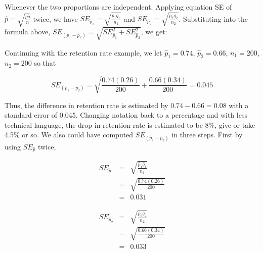 \documentclass[11pt]{book}\usepackage[]{graphicx}\usepackage[]{color}
\begin{document}
Whenever the two proportions are independent.  Applying equation SE of $\hat{p} = \sqrt{ \frac{ \hat{p} \hat{q} }{n}}$ twice, we have $SE_{\hat{p}_1} = \sqrt{ \frac{ \hat{p}_1 \hat{q}_1 }{n_1}}$ and $SE_{\hat{p}_2} = \sqrt{ \frac{ \hat{p}_2 \hat{q}_2 }{n_2}}$.  Substituting into the formula above, $SE_{(\hat{p}_1 - \hat{p}_2)} = \sqrt{ SE_{\hat{p}_1}^2 + SE_{\hat{p}_2}^2}$, we get:

\vspace{3mm}


\vspace{3mm}

Continuing with the retention rate example, we let $\hat{p}_1 = 0.74$, $\hat{p}_2 = 0.66$, $n_1 = 200$, $n_2 = 200$ so that

$$ SE_{( \hat{p}_1 - \hat{p}_2)} = \sqrt{ \frac{ 0.74 (0.26)}{200} + \frac{ 0.66 (0.34) }{200}} = 0.045 $$

Thus, the difference in retention rate is estimated by $0.74 - 0.66 = 0.08$ with a standard error of 0.045.  Changing notation back to a percentage and with less technical language, the drop-in retention rate is estimated to be 8\%, give or take 4.5\% or so. We also could have computed $ SE_{( \hat{p}_1 - \hat{p}_2)}$  in three steps.  First by using $SE_{\hat{p}}$ twice,

\begin{minipage}[ht]{7cm}

\begin{eqnarray*}
  SE_{\hat{p}_1} &=& \sqrt{ \frac{\hat{p}_1 \hat{q}_1}{n_1}} \\
  &=& \sqrt{ \frac{0.74  (0.26)}{200}} \\
  &=& 0.031
\end{eqnarray*} 

\end{minipage}
\begin{minipage}[ht]{7cm}

\begin{eqnarray*}
  SE_{\hat{p}_2} &=& \sqrt{ \frac{\hat{p}_2 \hat{q}_2}{n_2}} \\ 
  &=& \sqrt{ \frac{0.66  (0.34)}{200}} \\
  &=& 0.033
\end{eqnarray*}  

\end{minipage}
\end{document}

